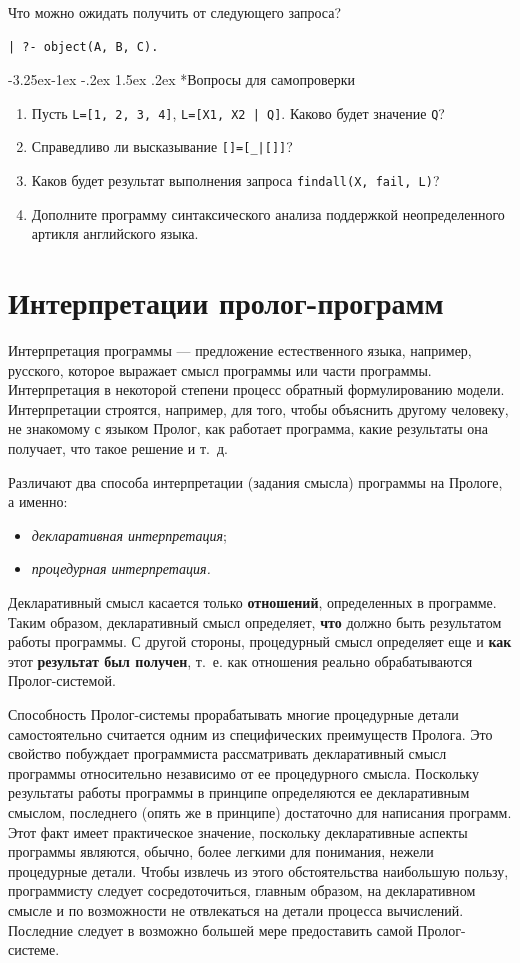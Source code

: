 \documentclass[12pt, openany, twoside]{book} %
\makeatletter
\renewcommand\subsubsection{\@startsection{subsubsection}{3}{\z@}%
                                     {-3.25ex\@plus -1ex \@minus -.2ex}%
                                     {1.5ex \@plus .2ex}%
                                     {\normalfont\normalsize\bfseries}}
\newenvironment{questions}{\subsubsection*{Вопросы для самопроверки}\begin{enumerate}}{\end{enumerate}}
\makeatother
\begin{document}
Что можно ожидать получить от следующего запроса?
{\tt\begin{verbatim}
| ?- object(А, В, С).
\end{verbatim}}
\begin{questions}
\item{} Пусть \texttt{L=[1, 2, 3, 4]}, \texttt{L=[X1, X2 | Q]}. Каково будет значение \texttt{Q}?
\item{} Справедливо ли высказывание \texttt{[]=[\_|[]]}?
\item{} Каков будет результат выполнения запроса \texttt{findall(X, fail, L)}?
\item{} Дополните программу синтаксического анализа поддержкой не\-опре\-де\-лен\-но\-го артикля английского языка.
\end{questions}

\chapter{Интерпретации пролог-программ}
Интерпретация программы --- предложение естественного языка, например, русского, которое выражает смысл программы или части программы. Интерпретация в некоторой степени процесс обратный формулированию модели. Интерпретации строятся, например, для того, чтобы объяснить другому человеку, не знакомому с языком Пролог, как работает программа, какие результаты она получает, что такое решение и т.~д.

Различают два способа \cite{Bratko} интерпретации (задания смысла) программы на Прологе, а именно:
\begin{itemize}
\item \emph{декларативная интерпретация};
\item \emph{процедурная интерпретация.}
\end{itemize}


Декларативный смысл касается только \textbf{отношений}, определенных в программе. Таким образом, декларативный смысл определяет, {\bf что} должно быть результатом работы программы. С другой стороны, процедурный смысл определяет еще и {\bf как} этот {\bf результат был получен}, т.~е. как отношения реально обрабатываются Пролог-системой.

Способность Пролог-системы прорабатывать многие процедурные детали самостоятельно считается одним из специфических преимуществ Пролога. Это свойство побуждает программиста рассматривать декларативный смысл программы относительно независимо от ее процедурного смысла. Поскольку результаты работы программы в принципе определяются ее декларативным смыслом, последнего (опять же в принципе) достаточно для написания программ. Этот факт имеет практическое значение, поскольку декларативные аспекты программы являются, обычно, более легкими для понимания, нежели процедурные детали. Чтобы извлечь из этого обстоятельства наибольшую пользу, программисту следует сосредоточиться, главным образом, на декларативном смысле и по возможности не отвлекаться на детали процесса вычислений. Последние следует в возможно большей мере предоставить самой Пролог-системе.
\end{document}
